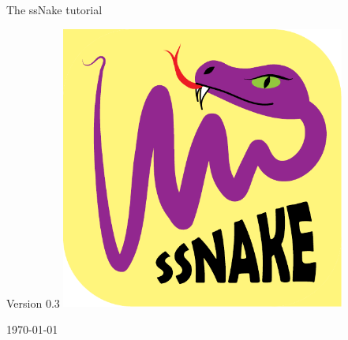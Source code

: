 \begin{titlepage}
\begin{center}




{\Huge The ssNake tutorial}

\vfill
\large Version 0.3
\vfill
\includegraphics[width=0.7\textwidth]{Images/logo.pdf}\

\vfill
\vfill
{\large \today}

\end{center}

\end{titlepage}
